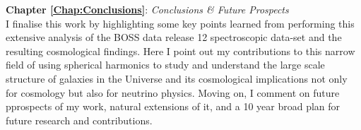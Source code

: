 
\bigskip

\textbf{Chapter \ref{Chap:Conclusions}}: \textit{Conclusions \& Future Prospects} \\[0.6em]
I finalise this work by highlighting some key points learned from performing this extensive analysis of the BOSS data release 12 spectroscopic data-set and the resulting cosmological findings. Here I point out my contributions to this narrow field of using spherical harmonics to study and understand the large scale structure of galaxies in the Universe and its cosmological implications not only for cosmology but also for neutrino physics. Moving on, I comment on future pprospects of my work, natural extensions of it, and a 10 year broad plan for future research and contributions.

